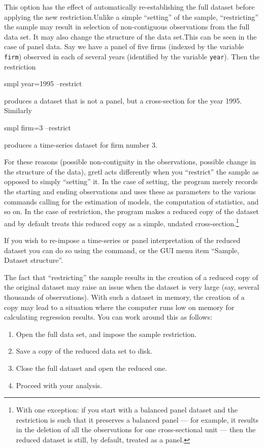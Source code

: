 This option has the effect of automatically re-establishing the full
dataset before applying the new restriction.Unlike a simple
``setting'' of the sample, ``restricting'' the sample may result in
selection of non-contiguous observations from the full data set.  It
may also change the structure of the data set.This can be seen in the
case of panel data.  Say we have a panel of five firms (indexed by the
variable \verb+firm+) observed in each of several years (identified by
the variable \verb+year+).  Then the restriction
%
\begin{code}
    smpl year=1995 --restrict
\end{code}
%
produces a dataset that is not a panel, but a cross-section for the
year 1995.  Similarly
%
\begin{code}
    smpl firm=3 --restrict
\end{code}
%
produces a time-series dataset for firm number 3.

For these reasons (possible non-contiguity in the observations,
possible change in the structure of the data), gretl acts differently
when you ``restrict'' the sample as opposed to simply ``setting'' it.
In the case of setting, the program merely records the starting and
ending observations and uses these as parameters to the various
commands calling for the estimation of models, the computation of
statistics, and so on. In the case of restriction, the program makes a
reduced copy of the dataset and by default treats this reduced copy as
a simple, undated cross-section.\footnote{With one exception: if you
  start with a balanced panel dataset and the restriction is such that
  it preserves a balanced panel --- for example, it results in the
  deletion of all the observations for one cross-sectional unit ---
  then the reduced dataset is still, by default, treated as a panel.}

If you wish to re-impose a time-series or panel interpretation of the
reduced dataset you can do so using the  command, or the
GUI menu item ``Sample, Dataset structure''.

The fact that ``restricting'' the sample results in the creation of a
reduced copy of the original dataset may raise an issue when the
dataset is very large (say, several thousands of observations).  With
such a dataset in memory, the creation of a copy may lead to a
situation where the computer runs low on memory for calculating
regression results.  You can work around this as follows:

\begin{enumerate}
\item Open the full data set, and impose the sample restriction.
\item Save a copy of the reduced data set to disk.
\item Close the full dataset and open the reduced one.
\item Proceed with your analysis.
\end{enumerate}

